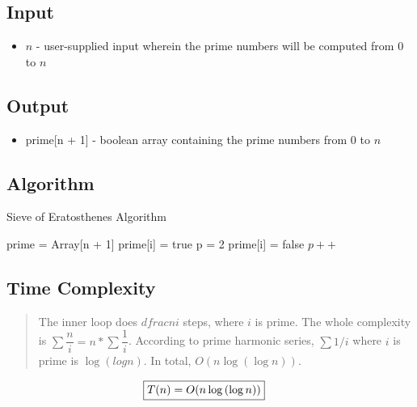 \documentclass[12pt]{article}%
\begin{document}
  \subsection{Input}
    \begin{itemize}
      \item $n$ - user-supplied input wherein the prime numbers will be computed from 0 to $n$
    \end{itemize}
  \subsection{Output}
    \begin{itemize}
      \item prime[n + 1] - boolean array containing the prime numbers from 0 to $n$
    \end{itemize}
  \subsection{Algorithm \cite{gfg_soe}}
    \begin{algorithm}[H]
        \caption{Sieve of Eratosthenes Algorithm}\label{soe}
        \begin{algorithmic}[1]
          \State prime = Array[n + 1] 
            \State prime[i] = true
          \EndFor 
          \State p = 2
                \State prime[i] = false
              \EndFor
            \EndIf
            \State $p++$
          \EndWhile 
        \EndFunction
      \end{algorithmic}
    \end{algorithm}
  \subsection{Time Complexity}
    \begin{quotation}
      The inner loop does $dfrac{n}{i}$ steps, where $i$ is prime. The whole	complexity is $\sum{\dfrac{n}{i}} = n*\sum{\dfrac{1}{i}}$. According to prime harmonic series, $\sum{1/i}$ where $i$ is prime is $\log{(log{n})}$. In total, $O(n \log{(\log{n})})$.
    \end{quotation}
    \begin{align*}
      \Aboxed{T(n) &= O(n \log{(\log{n})})}
    \end{align*}
\end{document}
